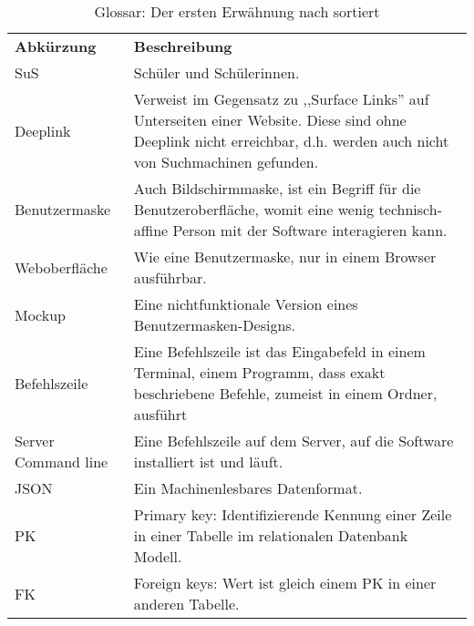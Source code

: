 \begin{table}[h]
	\centering
	\begin{tabularx}{\textwidth}{X X}
		\rowcolor[HTML]{C0C0C0}
		\textbf{Abkürzung} & \textbf{Beschreibung} \\
		SuS & Schüler und Schülerinnen. \\
		\rowcolor[HTML]{E7E7E7}
		Deeplink & Verweist im Gegensatz zu ,,Surface Links'' auf Unterseiten einer Website. Diese sind ohne Deeplink nicht erreichbar, d.h. werden auch nicht von Suchmachinen gefunden. \\
		Benutzermaske & Auch Bildschirmmaske, ist ein Begriff für die Benutzeroberfläche, womit eine wenig technisch-affine Person mit der Software interagieren kann.\\
		\rowcolor[HTML]{E7E7E7}
		Weboberfläche & Wie eine Benutzermaske, nur in einem Browser ausführbar. \\
		Mockup & Eine nichtfunktionale Version eines Benutzermasken-Designs. \\
		\rowcolor[HTML]{E7E7E7}
		Befehlszeile & Eine Befehlszeile ist das Eingabefeld in einem Terminal, einem Programm, dass exakt beschriebene Befehle, zumeist in einem Ordner, ausführt\\
		Server Command line & Eine Befehlszeile auf dem Server, auf die Software installiert ist und läuft. \\
		\rowcolor[HTML]{E7E7E7}
		JSON & Ein Machinenlesbares Datenformat. \\
		PK & Primary key: Identifizierende Kennung einer Zeile in einer Tabelle im relationalen Datenbank Modell. \\
		\rowcolor[HTML]{E7E7E7}
		FK & Foreign keys: Wert ist gleich einem PK in einer anderen Tabelle. \\
	\end{tabularx}
	\caption{Glossar: Der ersten Erwähnung nach sortiert}
	\label{table:glossar}
\end{table}
